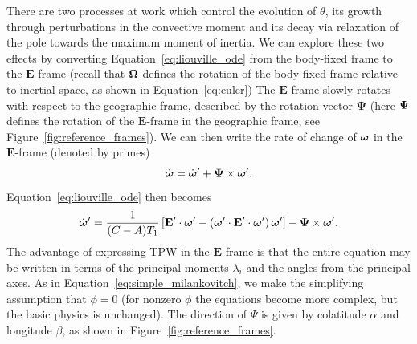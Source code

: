 \documentclass[extra,mreferee]{gji}
\begin{document}
There are two processes at work which control the evolution of $\theta$, its growth through perturbations in the convective moment and 
its decay via relaxation of the pole towards the maximum moment of inertia.
We can explore these two effects by converting Equation~\eqref{eq:liouville_ode}
from the body-fixed frame to the $\mathbf{E}$-frame (recall that $\mitbf{\Omega}$ defines
the rotation of the body-fixed frame relative to inertial space, as shown in Equation~\eqref{eq:euler})
The $\mathbf{E}$-frame slowly rotates with respect to the geographic frame, described by the rotation vector $\mathbf{\Psi}$ 
(here $\mitbf{\Psi}$ defines the rotation of the $\mathbf{E}$-frame in the geographic frame, see Figure~\ref{fig:reference_frames}).
We can then write the rate of change of $\mitbf{\omega}$ in the $\mathbf{E}$-frame (denoted by primes)
\begin{equation}
\dot{\mitbf{\omega}} = \dot{\mitbf{\omega}}^\prime + \mathbf{\Psi}\times \mitbf{\omega}^\prime.
\end{equation}
Equation~\eqref{eq:liouville_ode} then becomes
\begin{equation}
 \dot{\mitbf{\omega}}^\prime  = \frac{1}{(C-A)T_1} \left[ \mathbf{E}^\prime \cdot \mitbf{\omega}^\prime - \left( \mitbf{\omega}^\prime \cdot \mathbf{E}^\prime \cdot \mitbf{\omega}^\prime  \right) \mitbf{\omega}^\prime \right] - \mathbf{\Psi}\times \mitbf{\omega}^\prime.
\label{eq:liouville_ode_new_frame}
\end{equation}
The advantage of expressing TPW in the $\mathbf{E}$-frame is that the entire equation
may be written in terms of the principal moments $\lambda_i$ and the angles from the principal axes.
As in Equation~\eqref{eq:simple_milankovitch}, we make the simplifying assumption that $\phi=0$
(for nonzero $\phi$ the equations become more complex, but the basic physics is unchanged).
The direction of $\Psi$ is given by colatitude $\alpha$ and longitude $\beta$, as shown in Figure~\ref{fig:reference_frames}.
\end{document}
